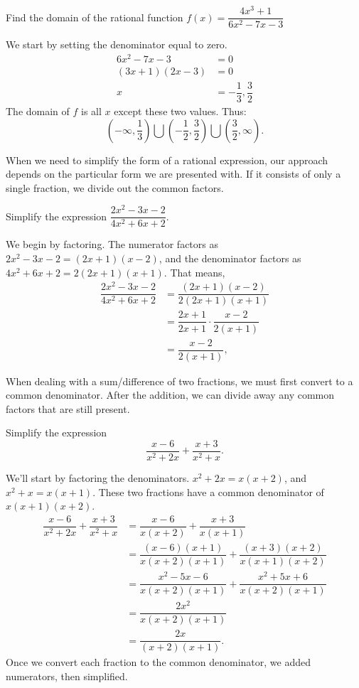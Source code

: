 \documentclass{ximera}
\begin{document}
\begin{example}
	Find the domain of the rational function $\displaystyle f(x) = \dfrac{4x^3+1}{6x^2-7x-3}$
	\begin{explanation}
		We start by setting the denominator equal to zero.
		\begin{align*}
			6x^2 - 7x - 3 &= 0\\
			(3x + 1)(2x - 3)&= 0\\
			x &= -\dfrac{1}{3} , \dfrac{3}{2}
		\end{align*}
		The domain of $f$ is all $x$ except these two values.  Thus:
		\[ \left( -\infty , \dfrac{1}{3}\right) \bigcup \left( -\dfrac{1}{2}, \dfrac{3}{2} \right) \bigcup \left( \dfrac{3}{2}, \infty \right). \]
	\end{explanation}
\end{example}


When we need to simplify the form of a rational expression, our approach depends on the particular form we are presented with.  If it consists of
only a single fraction, we divide out the common factors.
\begin{example}
	Simplify the expression $\displaystyle \dfrac{2x^2-3x-2}{4x^2+6x+2}$.
	\begin{explanation}
		We begin by factoring.  The numerator factors as $2x^2 - 3x -2 = (2x+1)(x-2)$, and the denominator factors as $4x^2+6x+2 = 2(2x+1)(x+1)$.
		That means,
		\begin{align*}
			\dfrac{2x^2-3x-2}{4x^2 + 6x + 2} &= \dfrac{(2x+1)(x-2)}{2(2x+1)(x+1)} \\
				&= \dfrac{2x+1}{2x+1} \cdot \dfrac{x-2}{2(x+1)}\\
				&= \dfrac{x-2}{2(x+1)},
		\end{align*}	
	\end{explanation}
\end{example}

When dealing with a sum/difference of two fractions, we must first convert to a common denominator.  After the addition,
we can divide away any common factors that are still present.
\begin{example}
	Simplify the expression \[ \dfrac{x-6}{x^2+2x} + \dfrac{x+3}{x^2+x}. \]
	\begin{explanation}
		We'll start by factoring the denominators.  $x^2+2x = x(x+2)$, and $x^2+x = x(x+1)$.
		These two fractions have a common denominator of $x(x+1)(x+2)$.
		\begin{align*}
			\dfrac{x-6}{x^2+2x} + \dfrac{x+3}{x^2+x} &= \dfrac{x-6}{x(x+2)} + \dfrac{x+3}{x(x+1)}\\
				&= \dfrac{(x-6)(x+1)}{x(x+2)(x+1)} + \dfrac{(x+3)(x+2)}{x(x+1)(x+2)}\\
				&= \dfrac{x^2-5x-6}{x(x+2)(x+1)} + \dfrac{x^2+5x+6}{x(x+2)(x+1)}\\ 
				&= \dfrac{2x^2}{x(x+2)(x+1)}\\
				&= \dfrac{2x}{(x+2)(x+1)}.
		\end{align*}
		Once we convert each fraction to the common denominator, we added numerators, then simplified.
	\end{explanation}
\end{example}
\end{document}
